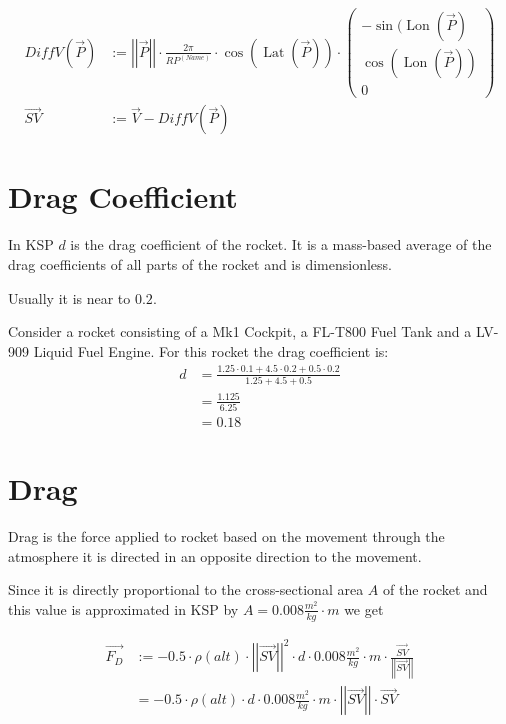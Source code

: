 \documentclass[11pt]{article}
\newcommand{\oa}[1]{\overrightarrow{#1}}
\newcommand{\F}[1]{\oa{F_{#1}}}
\newcommand{\Pos}{\oa{P}}
\newcommand{\Vel}{\oa{V}}
\newcommand{\absvec}[1]{\left|\left|{#1}\right|\right|}
\DeclareMathOperator{\Lat}{Lat}
\DeclareMathOperator{\Lon}{Lon}
\begin{document}
\begin{align}
  DiffV(\Pos) &:= \absvec{\Pos} \cdot \frac{2 \pi}{RP^{(Name)}} \cdot \cos\left(\Lat\left(\Pos\right)\right)\cdot\left(\begin{smallmatrix}-\sin(\Lon(\Pos)\\\cos(\Lon(\Pos))\\0\end{smallmatrix}\right)\\
  \oa{SV} &:= \Vel - DiffV(\Pos)
\end{align}

\section{Drag Coefficient}

In KSP $d$ is the drag coefficient of the rocket. It is a mass-based
average of the drag coefficients of all parts of the rocket and is
dimensionless.

Usually it is near to $0.2$.

Consider a rocket consisting of a Mk1 Cockpit, a FL-T800 Fuel Tank and
a LV-909 Liquid Fuel Engine. For this rocket the drag coefficient is:
\begin{align}
  d &= \frac{1.25 \cdot 0.1 + 4.5 \cdot 0.2 + 0.5 \cdot 0.2}{ 1.25 + 4.5 + 0.5 }\nonumber\\
  &= \frac{1.125}{6.25}\nonumber\\
  &= 0.18\nonumber
\end{align}

\section{Drag}

Drag is the force applied to rocket based on the movement through the
atmosphere it is directed in an opposite direction to the movement.

Since it is directly proportional to the cross-sectional area $A$ of
the rocket and this value is approximated in KSP by $A = 0.008
\frac{m^2}{kg} \cdot m$ we get

\begin{align}
  \F{D} &:= - 0.5 \cdot \rho(alt)\cdot \absvec{\oa{SV}}^2\cdot d \cdot 0.008\frac{m^2}{kg} \cdot m \cdot \frac{\oa{SV}}{\absvec{\oa{SV}}} \nonumber\\
  &= - 0.5 \cdot \rho(alt)\cdot d \cdot 0.008\frac{m^2}{kg} \cdot m \cdot \absvec{\oa{SV}} \cdot \oa{SV}
\end{align}
\end{document}
